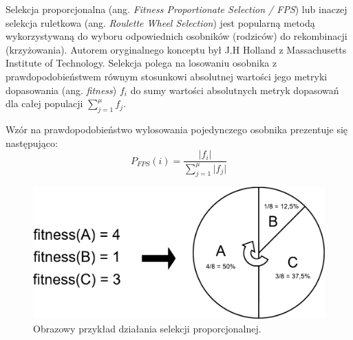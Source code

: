 \documentclass[a4paper,11pt]{article}
\begin{document}
    Selekcja proporcjonalna (ang. \textit{Fitness Proportionate Selection / FPS}) lub inaczej selekcja ruletkowa (ang. \textit{Roulette Wheel Selection}) jest popularną metodą wykorzystywaną do wyboru odpowiednich osobników (rodziców) do rekombinacji (krzyżowania). Autorem oryginalnego konceptu był J.H Holland z Massachusetts Institute of Technology. Selekcja polega na losowaniu osobnika z prawdopodobieństwem równym stosunkowi absolutnej wartości jego metryki dopasowania (ang. \textit{fitness}) $f_{i}$ do sumy wartości absolutnych metryk dopasowań dla całej populacji $\sum_{j=1}^{\mu} f_{j}$\cite{IntroductionToEvolutionaryComputing2015}.

    \bigskip

    \noindent
    \begin{minipage}[H]{\textwidth}
        \setlength\parindent{17pt} Wzór na prawdopodobieństwo wylosowania pojedynczego osobnika prezentuje się następująco: \\
        \begin{equation}
            \label{eq:fitness_proportionate_selection}
            P_{FPS}(i) = \frac{\lvert f_{i} \rvert}{\sum_{j=1}^{\mu} \lvert f_{j} \rvert}
        \end{equation}
    \end{minipage}

    \bigskip

    \begin{figure}[H]
        \label{fig:proportional_selection}
        \centering
        \includegraphics[width=\textwidth]{proportional_selection}
        \caption{Obrazowy przykład działania selekcji proporcjonalnej.}
    \end{figure}

    \bigskip
\end{document}
